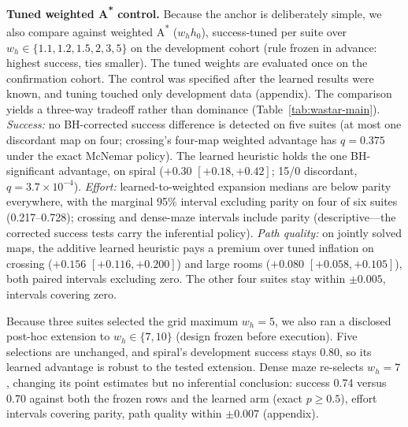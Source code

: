 \documentclass[letterpaper]{article} %
\begin{document}
\textbf{Tuned weighted A\textsuperscript{*} control.} Because the anchor is deliberately simple, we also compare against weighted A\textsuperscript{*} ($w_h h_0$), success-tuned per suite over $w_h \in \{1.1, 1.2, 1.5, 2, 3, 5\}$ on the development cohort (rule frozen in advance: highest success, ties smaller). The tuned weights are evaluated once on the confirmation cohort. The control was specified after the learned results were known, and tuning touched only development data (appendix). The comparison yields a three-way tradeoff rather than dominance (Table~\ref{tab:wastar-main}). \emph{Success:} no BH-corrected success difference is detected on five suites (at most one discordant map on four; crossing's four-map weighted advantage has $q{=}0.375$ under the exact McNemar policy). The learned heuristic holds the one BH-significant advantage, on spiral ($+0.30$ $[+0.18,+0.42]$; 15/0 discordant, $q{=}3.7\times10^{-4}$). \emph{Effort:} learned-to-weighted expansion medians are below parity everywhere, with the marginal 95\% interval excluding parity on four of six suites (0.217--0.728); crossing and dense-maze intervals include parity (descriptive---the corrected success tests carry the inferential policy). \emph{Path quality:} on jointly solved maps, the additive learned heuristic pays a premium over tuned inflation on crossing ($+0.156$ $[+0.116,+0.200]$) and large rooms ($+0.080$ $[+0.058,+0.105]$), both paired intervals excluding zero. The other four suites stay within $\pm 0.005$, intervals covering zero.

Because three suites selected the grid maximum $w_h{=}5$, we also ran a disclosed post-hoc extension to $w_h \in \{7, 10\}$ (design frozen before execution). Five selections are unchanged, and spiral's development success stays 0.80, so its learned advantage is robust to the tested extension. Dense maze re-selects $w_h{=}7$, changing its point estimates but no inferential conclusion: success 0.74 versus 0.70 against both the frozen rows and the learned arm (exact $p \geq 0.5$), effort intervals covering parity, path quality within $\pm 0.007$ (appendix).
\end{document}
